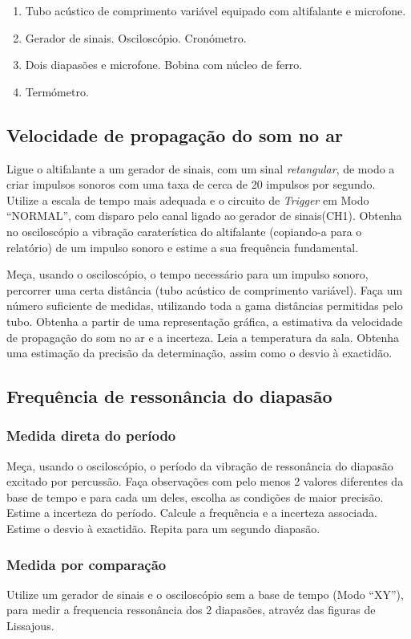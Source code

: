 \documentclass[a4paper,12pt]{article}      %
\begin{document}
\begin{enumerate}
\item Tubo acústico de comprimento variável equipado com altifalante e microfone. 
\item Gerador de sinais. Osciloscópio. Cronómetro. 
\item Dois diapasões e microfone. Bobina com núcleo de ferro. 
\item Termómetro. 
\end{enumerate}

\subsection{\sf Velocidade de propagação do som no ar}
Ligue o altifalante a um gerador de sinais, com um sinal \emph{retangular}, de modo a criar impulsos sonoros com uma taxa de cerca de 20 impulsos por segundo.
Utilize a escala de tempo mais adequada e o circuito de \emph{Trigger} em Modo “NORMAL”, com disparo pelo canal ligado ao gerador de sinais(CH1).  
Obtenha no osciloscópio a vibração caraterística do altifalante (copiando-a para o relatório) de um impulso sonoro e estime a sua frequência fundamental.  

Meça, usando o osciloscópio, o tempo necessário para um impulso sonoro, percorrer uma certa distância (tubo acústico de comprimento variável).
Faça um número suficiente de medidas, utilizando toda a gama distâncias permitidas pelo tubo. Obtenha a partir de uma representação gráfica, a estimativa da velocidade de propagação do som no ar e a incerteza. Leia a temperatura da sala. Obtenha uma estimação da precisão da determinação, assim como o desvio à exactidão. 

\subsection{\sf Frequência de ressonância do diapasão}
\subsubsection{\sf Medida direta do período}
Meça, usando o osciloscópio, o período da vibração de ressonância do diapasão excitado por percussão. Faça observações com pelo menos 2 valores diferentes da base de tempo e para cada um deles, escolha as condições de maior precisão. Estime a incerteza do período. Calcule a frequência e a incerteza associada. Estime o desvio à exactidão. Repita para um segundo diapasão. 
\subsubsection{\sf Medida por comparação}
Utilize um gerador de sinais e o osciloscópio sem a base de tempo (Modo “XY”), para
medir a frequencia ressonância dos 2 diapasões, atravéz das figuras de Lissajous.
\end{document}
